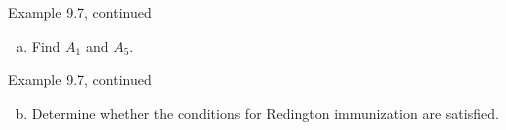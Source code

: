 \documentclass{beamer}
\begin{document}
\begin{frame}{Example 9.7, continued}

\begin{enumerate}[a)]
\item Find $A_1$ and $A_5$.
\end{enumerate}

\vfill
\end{frame}

\begin{frame}{Example 9.7, continued}

\begin{enumerate}[a)]
\setcounter{enumi}{1}
\item Determine whether the conditions for Redington immunization are satisfied.
\end{enumerate}

\vfill
\end{frame}
\end{document}
